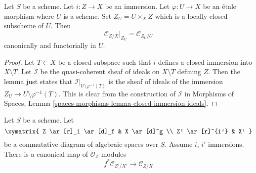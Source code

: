 \begin{lemma}
\label{lemma-etale-conormal}
Let $S$ be a scheme. Let $i : Z \to X$ be an immersion.
Let $\varphi : U \to X$ be an \'etale morphism where $U$ is a scheme.
Set $Z_U = U \times_X Z$ which is a locally closed subscheme of $U$.
Then
$$
\mathcal{C}_{Z/X}|_{Z_U} = \mathcal{C}_{Z_U/U}
$$
canonically and functorially in $U$.
\end{lemma}

\begin{proof}
Let $T \subset X$ be a closed subspace such that $i$ defines a closed
immersion into $X \setminus T$.
Let $\mathcal{I}$ be the quasi-coherent sheaf of ideals on
$X \setminus T$ defining $Z$. Then the lemma just states that
$\mathcal{I}|_{U \setminus \varphi^{-1}(T)}$ is the sheaf of ideals of
the immersion $Z_U \to U \setminus \varphi^{-1}(T)$.
This is clear from the construction of $\mathcal{I}$ in
Morphisms of Spaces, Lemma \ref{spaces-morphisms-lemma-closed-immersion-ideals}.
\end{proof}

\begin{lemma}
\label{lemma-conormal-functorial}
Let $S$ be a scheme. Let
$$
\xymatrix{
Z \ar[r]_i \ar[d]_f & X \ar[d]^g \\
Z' \ar[r]^{i'} & X'
}
$$
be a commutative diagram of algebraic spaces over $S$.
Assume $i$, $i'$ immersions. There is a canonical map
of $\mathcal{O}_Z$-modules
$$
f^*\mathcal{C}_{Z'/X'}
\longrightarrow
\mathcal{C}_{Z/X}
$$
\end{lemma}

